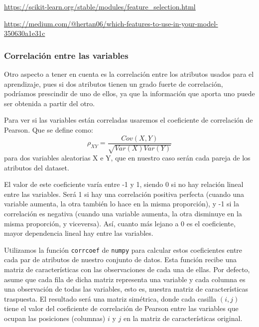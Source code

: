 \documentclass[a4]{article}
\begin{document}
\href{https://scikit-learn.org/stable/modules/feature_selection.html#univariate-feature-selection}{https://scikit-learn.org/stable/modules/feature\_selection.html}

\href{https://medium.com/@hertan06/which-features-to-use-in-your-model-350630a1e31c}{https://medium.com/@hertan06/which-features-to-use-in-your-model-350630a1e31c}


\subsubsection{Correlación entre las variables}

Otro aspecto a tener en cuenta es la correlación entre los atributos usados para el aprendizaje, pues si dos atributos tienen un grado fuerte de correlación, podríamos prescindir de uno de ellos, ya que la información que aporta uno puede ser obtenida a partir del otro. 

Para ver si las variables están correladas usaremos el coeficiente de correlación de Pearson. Que se define como: 
$$ \rho_{XY}=\frac{Cov(X,Y)}{\sqrt{Var(X)Var(Y)}}$$
para dos variables aleatorias X e Y, que en nuestro caso serán cada pareja de los atributos del dataset. 

El valor de este coeficiente varía entre -1 y 1, siendo 0 si no hay relación lineal entre las variables. Será 1 si hay una correlación positiva perfecta (cuando una variable aumenta, la otra también lo hace en la misma proporción), y -1 si la correlación es negativa (cuando una variable aumenta, la otra disminuye en la misma proporción, y viceversa). Así, cuanto más lejano a 0 es el coeficiente, mayor dependencia lineal hay entre las variables. 

Utilizamos la función \lstinline|corrcoef| de \lstinline|numpy| para calcular estos coeficientes entre cada par de atributos de nuestro conjunto de datos. Esta función recibe una matriz de características con las observaciones de cada una de ellas. Por defecto, asume que cada fila de dicha matriz representa una variable y cada columna es una observación de todas las variables, esto es, nuestra matriz de características traspuesta. El resultado será una matriz simétrica, donde cada casilla $(i,j)$ tiene el valor del coeficiente de correlación de Pearson entre las variables que ocupan las posiciones (columnas) $i$ y $j$ en la matriz de características original. 
\end{document}
